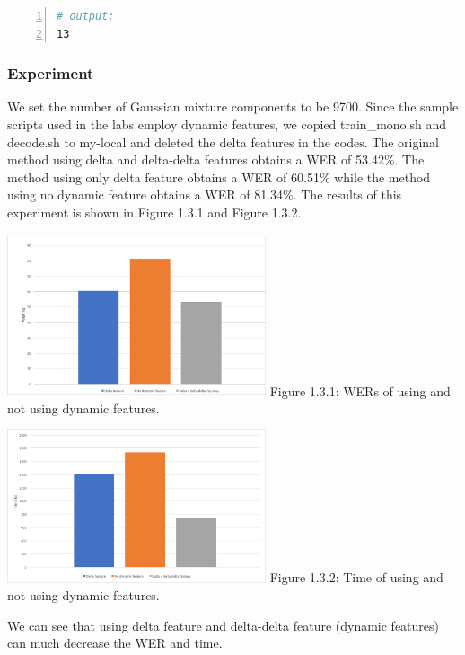 \documentclass[]{article}
\begin{document}
\begin{multicols*}{2}
\begin{lstlisting}[language=sh,showstringspaces=false,numbers=left,tabsize=4, xleftmargin=\parindent, frame=single, basicstyle=\tiny]
# output:
13
\end{lstlisting}


\subsubsection{Experiment}
We set the number of Gaussian mixture components to be 9700. Since the sample scripts used in the labs employ dynamic features, we copied train\_mono.sh and decode.sh to my-local and deleted the delta features in the codes. The original method using delta and delta-delta features obtains a WER of 53.42\%. The method using only delta feature obtains a WER of 60.51\% while the method using no dynamic feature obtains a WER of 81.34\%. The results of this experiment is shown in Figure 1.3.1 and Figure 1.3.2. 

\begin{center}
\includegraphics[width=3in]{Picture4.png} 
Figure 1.3.1: WERs of using and not using dynamic features.
\end{center}

\begin{center}
\includegraphics[width=3in]{Picture3.png} 
Figure 1.3.2: Time of using and not using dynamic features.
\end{center}

We can see that using delta feature and delta-delta feature (dynamic features) can much decrease the WER and time.


\end{multicols*}
\end{document}
